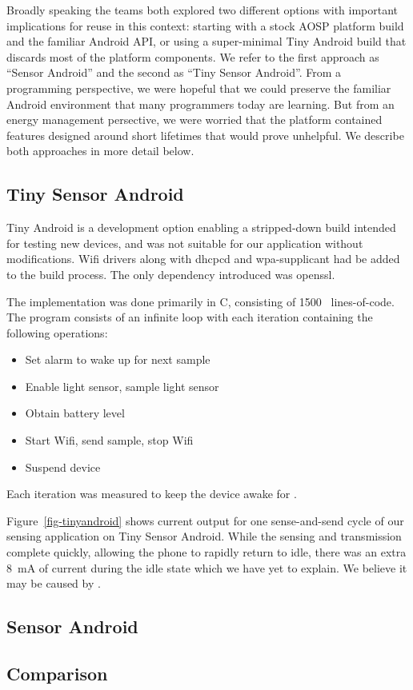 Broadly speaking the teams both explored two different options with important
implications for reuse in this context: starting with a stock AOSP platform
build and the familiar Android API, or using a super-minimal Tiny Android
build that discards most of the platform components. We refer to the first
approach as ``Sensor Android'' and the second as ``Tiny Sensor Android''.
From a programming perspective, we were hopeful that we could preserve the
familiar Android environment that many programmers today are learning. But
from an energy management persective, we were worried that the platform
contained features designed around short lifetimes that would prove
unhelpful. We describe both approaches in more detail below.

\subsection{Tiny Sensor Android}
\label{subsec-tiny}

Tiny Android is a development option enabling a stripped-down build intended
for testing new devices, and was not suitable for our application without
modifications. Wifi drivers along with dhcpcd and wpa-supplicant had be added to
the build process. The only dependency introduced was openssl.

The implementation was done primarily in C, consisting of 1500~ lines-of-code.
The program consists of an infinite loop with each iteration containing the
following operations: 
\begin{itemize}
  \item Set alarm to wake up for next sample
  \item Enable light sensor, sample light sensor
  \item Obtain battery level
  \item Start Wifi, send sample, stop Wifi
  \item Suspend device
\end{itemize}
Each iteration was measured to keep the device awake for .

Figure~\ref{fig-tinyandroid} shows current output for one sense-and-send
cycle of our sensing application on Tiny Sensor Android. While the sensing
and transmission complete quickly, allowing the phone to rapidly return to
idle, there was an extra 8~mA of current during the idle state which we have
yet to explain. We believe it may be caused by .

\subsection{Sensor Android}
\label{subsec-full}


\subsection{Comparison}
